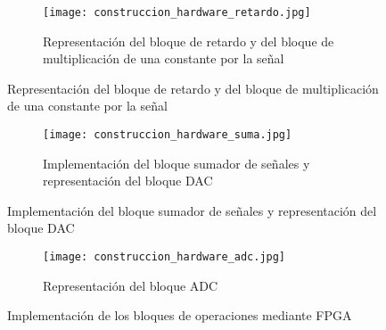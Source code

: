 \documentclass[informe.tex]{subfiles}
\begin{document}
\begin{figure}[h!]
    \centering
    \begin{subfigure}[b]{1\textwidth}
         \centering
         \texttt{[image: construccion\_hardware\_retardo.jpg]}
         \caption{Representación del bloque de retardo y del bloque de multiplicación de una constante por la señal}
         \label{fig:construccion:hardware:fpga:retardo}
    \end{subfigure}
\end{figure}

\begin{figure}[h]
	\ContinuedFloat
    \begin{subfigure}[b]{1\textwidth}
         \centering
         \texttt{[image: construccion\_hardware\_suma.jpg]}
         \caption{Implementación del bloque sumador de señales y representación del bloque DAC}
         \label{fig:construccion:hardware:fpga:suma_dac}
    \end{subfigure}
\end{figure}
   
\begin{figure}[h] 
	\ContinuedFloat   
    \begin{subfigure}[b]{1\textwidth}
         \centering
         \texttt{[image: construccion\_hardware\_adc.jpg]}
         \caption{Representación del bloque ADC}
         \label{fig:construccion:hardware:fpga:adc}
    \end{subfigure}
    \caption{Implementación de los bloques de operaciones mediante FPGA}
    \label{fig:construccion:hardware:fpga:adc}    
\end{figure}
\end{document}
